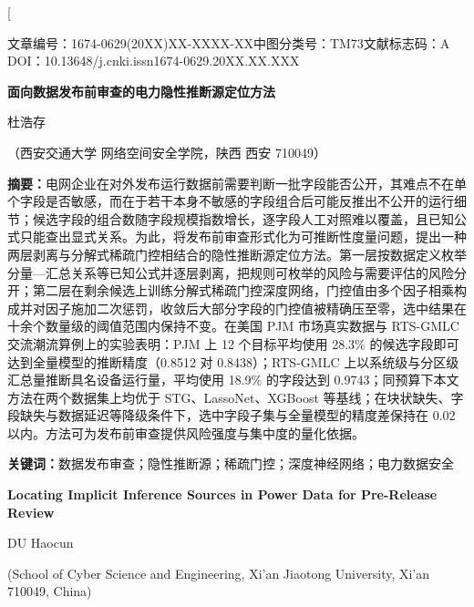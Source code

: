 \documentclass[UTF8,zihao=5,twoside]{ctexart}
\newcommand{\articleinfo}{文章编号：1674-0629(20XX)XX-XXXX-XX\quad 中图分类号：TM73\quad 文献标志码：A\\
DOI：10.13648/j.cnki.issn1674-0629.20XX.XX.XXX}
\begin{document}
\twocolumn[

\begin{center}
{\articleinfo}\par\vspace{1.0em}
{\sffamily{}\bfseries 面向数据发布前审查的电力隐性推断源定位方法}\par\vspace{0.8em}
{杜浩存}\par\vspace{0.4em}
{（西安交通大学 网络空间安全学院，陕西 西安 710049）}\par\vspace{0.8em}
\end{center}

\noindent\textbf{摘要：}电网企业在对外发布运行数据前需要判断一批字段能否公开，其难点不在单个字段是否敏感，而在于若干本身不敏感的字段组合后可能反推出不公开的运行细节；候选字段的组合数随字段规模指数增长，逐字段人工对照难以覆盖，且已知公式只能查出显式关系。为此，将发布前审查形式化为可推断性度量问题，提出一种两层剥离与分解式稀疏门控相结合的隐性推断源定位方法。第一层按数据定义枚举分量—汇总关系等已知公式并逐层剥离，把规则可枚举的风险与需要评估的风险分开；第二层在剩余候选上训练分解式稀疏门控深度网络，门控值由多个因子相乘构成并对因子施加二次惩罚，收敛后大部分字段的门控值被精确压至零，选中结果在十余个数量级的阈值范围内保持不变。在美国 PJM 市场真实数据与 RTS-GMLC 交流潮流算例上的实验表明：PJM 上 12 个目标平均使用 28.3\% 的候选字段即可达到全量模型的推断精度（0.8512 对 0.8438）；RTS-GMLC 上以系统级与分区级汇总量推断具名设备运行量，平均使用 18.9\% 的字段达到 0.9743；同预算下本文方法在两个数据集上均优于 STG、LassoNet、XGBoost 等基线；在块状缺失、字段缺失与数据延迟等降级条件下，选中字段子集与全量模型的精度差保持在 0.02 以内。方法可为发布前审查提供风险强度与集中度的量化依据。\par
\noindent\textbf{关键词：}数据发布审查；隐性推断源；稀疏门控；深度神经网络；电力数据安全\par\vspace{0.8em}

\begin{center}
{\bfseries\large Locating Implicit Inference Sources in Power Data for Pre-Release Review}\par\vspace{0.5em}
{DU Haocun}\par\vspace{0.3em}
{\small (School of Cyber Science and Engineering, Xi'an Jiaotong University, Xi'an 710049, China)}\par\vspace{0.5em}
\end{center}
\end{document}
